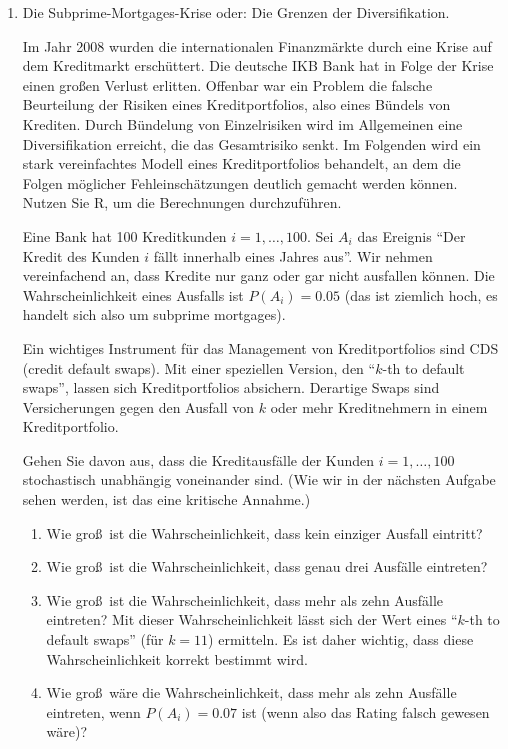 \begin{enumerate}
\item Die Subprime-Mortgages-Krise oder: Die Grenzen der Diversifikation.

Im Jahr 2008 wurden die internationalen Finanzm\"{a}rkte durch
eine Krise auf dem Kreditmarkt ersch\"{u}ttert. Die deutsche IKB Bank hat in
Folge der Krise einen gro\ss en Verlust erlitten. Offenbar war ein Problem
die falsche Beurteilung der Risiken eines Kre\-dit\-portfolios, also eines
Bündels von Krediten. Durch B\"{u}ndelung von Einzelrisiken wird im
Allgemeinen eine Diversifikation erreicht, die das Gesamtrisiko senkt. Im
Folgenden wird ein stark vereinfachtes Modell eines Kreditportfolios
behandelt, an dem die Folgen m\"{o}glicher Fehleinsch\"{a}tzungen deutlich
gemacht werden k\"{o}nnen. Nutzen Sie R, um die Berechnungen durchzuführen.

Eine Bank hat 100 Kreditkunden $i=1,\ldots ,100$. Sei $A_{i}$ das Ereignis
"`Der Kredit des Kunden $i$ f\"{a}llt innerhalb eines Jahres aus"'.
Wir nehmen vereinfachend an, dass Kredite nur ganz
oder gar nicht ausfallen k\"{o}nnen. Die Wahrscheinlichkeit eines Ausfalls
ist $P(A_{i})=0.05$ (das ist ziemlich hoch, es handelt sich also um subprime
mortgages).

Ein wichtiges Instrument f\"{u}r das Management von Kreditportfolios sind
CDS (credit default swaps). Mit einer speziellen Version, den "`$k$-th to 
default swaps"', lassen sich Kreditportfolios
absichern. Derartige Swaps sind Versicherungen gegen den Ausfall von $k$
oder mehr Kreditnehmern in einem Kreditportfolio.

Gehen Sie davon aus, dass die Kreditausf\"{a}lle der Kunden $i=1,\ldots ,100$
stochastisch unabh\"{a}ngig voneinander sind. (Wie wir in der n\"{a}chsten
Aufgabe sehen werden, ist das eine kritische Annahme.)
\begin{enumerate}
\item Wie gro\ss\ ist die Wahrscheinlichkeit, dass kein einziger Ausfall
eintritt?
\item Wie gro\ss\ ist die Wahrscheinlichkeit, dass genau drei Ausf\"{a}lle
eintreten?
\item Wie gro\ss\ ist die Wahrscheinlichkeit, dass mehr als zehn Ausfälle 
eintreten? Mit dieser Wahrscheinlichkeit l\"{a}sst sich der Wert eines
"`$k$-th to default swaps"' (f\"{u}r $k=11$) ermitteln. Es ist daher 
wichtig, dass diese Wahrscheinlichkeit korrekt bestimmt wird.
\item Wie gro\ss\ w\"{a}re die Wahrscheinlichkeit, dass mehr als zehn 
Ausfälle eintreten, wenn $P(A_{i})=0.07$ ist (wenn also das Rating falsch
gewesen wäre)?
\end{enumerate}


\end{enumerate}
